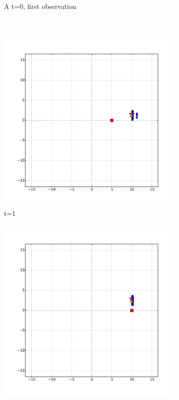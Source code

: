 \begin{figure}
\begin{subfigure}[b]{0.3\textwidth}
	            \caption{A t=0, first observation}
	            \label{fig:high_vel_noise_t_0}
	    \end{subfigure}
	    ~ %
	    \begin{subfigure}[b]{0.3\textwidth}
	            \includegraphics[width=\textwidth]{high_vel_noise_t_1}
	            \caption{t=1}
	            \label{fig:high_vel_noise_t_1}
	    \end{subfigure}
	    \begin{subfigure}[b]{0.3\textwidth}
	            \includegraphics[width=\textwidth]{high_vel_noise_t_2}

\end{subfigure}
\end{figure}
